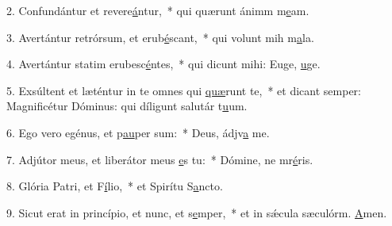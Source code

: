 2. Confundántur et revere\uline{á}ntur,~* qui quærunt ánimm m\uline{e}am.\par 
3. Avertántur retrórsum, et erub\uline{é}scant,~* qui volunt mih m\uline{a}la.\par 
4. Avertántur statim erubesc\uline{é}ntes,~* qui dicunt mihi: Euge, \uline{u}ge.\par 
5. Exsúltent et læténtur in te omnes qui \uline{quæ}runt te,~* et dicant semper: Magnificétur Dóminus: qui díligunt salutár t\uline{u}um.\par 
6. Ego vero egénus, et p\uline{au}per sum:~* Deus, ádjv\uline{a} me.\par 
7. Adjútor meus, et liberátor meus \uline{e}s tu:~* Dómine, ne mr\uline{é}ris.\par 
8. Glória Patri, et F\uline{í}lio,~* et Spirítu S\uline{a}ncto.\par 
9. Sicut erat in princípio, et nunc, et s\uline{e}mper,~* et in sǽcula sæculórm. \uline{A}men.\par 
